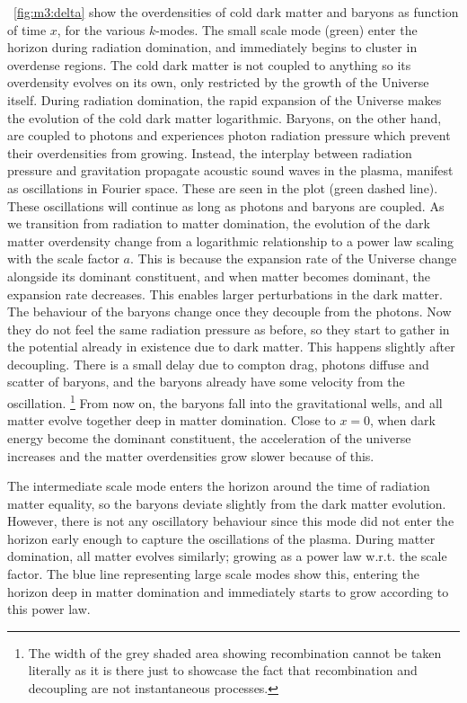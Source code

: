     ~\cref{fig:m3:delta} show the overdensities of cold dark matter and baryons as function of time $x$, for the various $k$-modes. The small scale mode (green) enter the horizon during radiation domination, and immediately begins to cluster in overdense regions. The cold dark matter is not coupled to anything so its overdensity evolves on its own, only restricted by the growth of the Universe itself. During radiation domination, the rapid expansion of the Universe makes the evolution of the cold dark matter logarithmic. Baryons, on the other hand, are coupled to photons and experiences photon radiation pressure which prevent their overdensities from growing. Instead, the interplay between radiation pressure and gravitation propagate acoustic sound waves in the plasma, manifest as oscillations in Fourier space. These are seen in the plot (green dashed line). These oscillations will continue as long as photons and baryons are coupled. As we transition from radiation to matter domination, the evolution of the dark matter overdensity change from a logarithmic relationship to a power law scaling with the scale factor $a$. This is because the expansion rate of the Universe change alongside its dominant constituent, and when matter becomes dominant, the expansion rate decreases. This enables larger perturbations in the dark matter. The behaviour of the baryons change once they decouple from the photons. Now they do not feel the same radiation pressure as before, so they start to gather in the potential already in existence due to dark matter. This happens slightly after decoupling. There is a small delay due to compton drag, photons diffuse and scatter of baryons, and the baryons already have some velocity from the oscillation. \footnote{The width of the grey shaded area showing recombination cannot be taken literally as it is there just to showcase the fact that recombination and decoupling are not instantaneous processes.} From now on, the baryons fall into the gravitational wells, and all matter evolve together deep in matter domination. Close to $x=0$, when dark energy become the dominant constituent, the acceleration of the universe increases and the matter overdensities grow slower because of this.

    The intermediate scale mode enters the horizon around the time of radiation matter equality, so the baryons deviate slightly from the dark matter evolution. However, there is not any oscillatory behaviour since this mode did not enter the horizon early enough to capture the oscillations of the plasma. During matter domination, all matter evolves similarly; growing as a power law w.r.t. the scale factor. The blue line representing large scale modes show this, entering the horizon deep in matter domination and immediately starts to grow according to this power law. 
    

